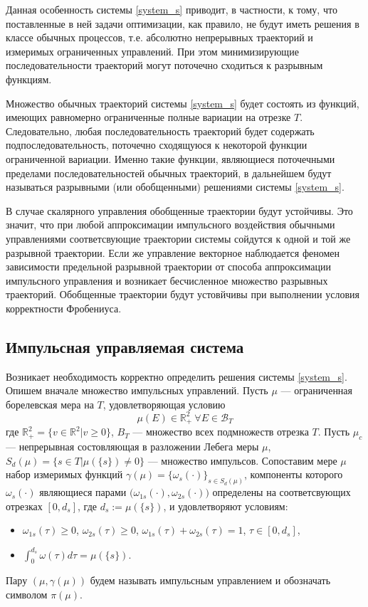 \documentclass[a4paper,12pt]{article}
\begin{document}
Данная особенность системы \eqref{system_s} приводит, в частности, к тому, что
поставленные в ней задачи оптимизации, как правило, не будут иметь
решения в классе обычных процессов, т.е. абсолютно непрерывных
траекторий и измеримых ограниченных управлений. При этом
минимизирующие последовательности траекторий могут поточечно сходиться
к разрывным функциям.

Множество обычных траекторий системы \eqref{system_s} будет состоять
из функций, имеющих равномерно ограниченные полные вариации на отрезке
$T$. Следовательно, любая последовательность траекторий будет
содержать подпоследовательность, поточечно сходящуюся к некоторой
функции ограниченной вариации. Именно такие функции, являющиеся
поточечными пределами последовательностей обычных траекторий, в
дальнейшем будут называться разрывными (или обобщенными) решениями
системы \eqref{system_s}.

В случае скалярного управления обобщенные траектории будут устойчивы.
Это значит, что при любой аппроксимации импульсного воздействия обычными
управлениями соответсвующие траектории системы сойдутся к одной и той
же разрывной траектории. Если же управление векторное наблюдается
феномен зависимости предельной разрывной траектории от способа
аппроксимации импульсного управления и возникает бесчисленное
множество разрывных траекторий. Обобщенные траектории будут устовйчивы
при выполнении условия корректности Фробениуса. \cite{DS2000}

\subsection{Импульсная управляемая система}
\label{sec:ids}

Возникает необходимость корректно определить решения системы
\eqref{system_s}. Опишем вначале множество импульсных управлений. Пусть $\mu$ ---
ограниченная борелевская мера на $T$, удовлетворяющая условию
\begin{equation*}
    \mu(E) \in \mathbb{R}_+^2 \ \forall E \in \mathcal{B}_T
\end{equation*}
где $\mathbb{R}_+^2 = \{v \in \mathbb{R}^2 | v \ge 0\}$, $B_T$ ---
множество всех подмножеств отрезка $T$. Пусть $\mu_c$ --- непрерывная
состовляющая в разложении Лебега меры $\mu$,
$S_d(\mu) = \{ s \in T | \mu(\{s\}) \neq 0\}$ --- множество
импульсов. Сопоставим мере $\mu$ набор измеримых функций
$\gamma(\mu) = \{ \omega_s(\cdot) \}_{s\in S_d(\mu)}$, компоненты
которого $\omega_s(\cdot)$ являющиеся парами
$\big(\omega_{1s}(\cdot),\omega_{2s}(\cdot)\big)$ определены на
соответсвующих отрезках $[0,d_s]$, где $d_s := \mu(\{s\})$, и
удовлетворяют условиям:
\begin{itemize}
    \item $\omega_{1s}(\tau) \ge 0$, $\omega_{2s}(\tau) \ge 0$, 
        $\omega_{1s}(\tau) + \omega_{2s}(\tau) = 1$, $\tau \in [0,d_s]$,
    \item $\displaystyle\int_{0}^{d_s} \omega(\tau) d\tau = \mu(\{s\})$.
\end{itemize}
Пару $(\mu,\gamma(\mu))$ будем называть импульсным управлением и
обозначать символом $\pi(\mu)$.
\end{document}
